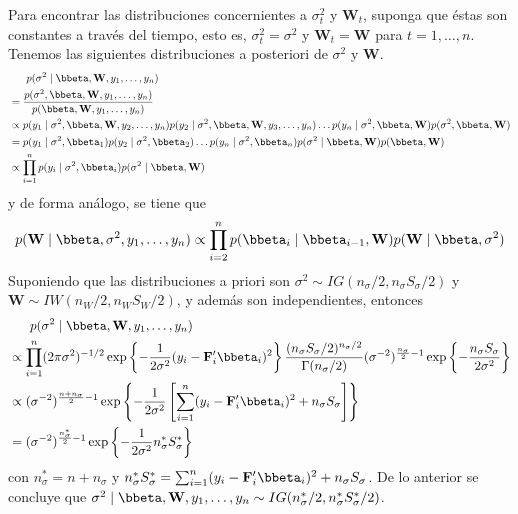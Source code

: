 Para encontrar las distribuciones concernientes a $\sigma^2_t$ y $\mathbf{W}_t$, suponga que éstas son constantes a través del tiempo, esto es, $\sigma^2_t=\sigma^2$ y $\mathbf{W}_t=\mathbf{W}$ para $t=1,\ldots,n$. Tenemos las siguientes distribuciones a posteriori de $\sigma^2$ y $\mathbf{W}$.
\begin{align*}
&\ \ \ \ \ p(\sigma^2 \mid \bbeta,\mathbf{W},y_1,\ldots,y_n)\\
&=\frac{p(\sigma^2,\bbeta,\mathbf{W},y_1,\ldots,y_n)}{p(\bbeta,\mathbf{W},y_1,\ldots,y_n)}\\
&\propto p(y_1 \mid \sigma^2,\bbeta,\mathbf{W},y_2,\ldots,y_n)p(y_2 \mid \sigma^2,\bbeta,\mathbf{W},y_3,\ldots,y_n)\ldots p(y_n \mid \sigma^2,\bbeta,\mathbf{W})p(\sigma^2,\bbeta,\mathbf{W})\\
&=p(y_1 \mid \sigma^2,\bbeta_1)p(y_2 \mid \sigma^2,\bbeta_2)\ldots p(y_n \mid \sigma^2,\bbeta_n)p(\sigma^2 \mid \bbeta,\mathbf{W})p(\bbeta,\mathbf{W})\\
&\propto \prod_{i=1}^np(y_i \mid \sigma^2,\bbeta_i)p(\sigma^2 \mid \bbeta,\mathbf{W})
\end{align*}
y de forma análogo, se tiene que
\begin{equation*}
p(\mathbf{W} \mid \bbeta,\sigma^2,y_1,\ldots,y_n)\propto\prod_{i=2}^np(\bbeta_i \mid \bbeta_{i-1},\mathbf{W})p(\mathbf{W} \mid \bbeta,\sigma^2)
\end{equation*}
Suponiendo que las distribuciones a priori son $\sigma^2\sim IG(n_\sigma/2,n_\sigma S_\sigma/2)$ y $\mathbf{W}\sim IW(n_W/2,n_WS_W/2)$, y además son independientes, entonces
\begin{align*}
&\ \ \ \ \ p(\sigma^2 \mid \bbeta,\mathbf{W},y_1,\ldots,y_n)\\
&\propto \prod_{i=1}^n(2\pi\sigma^2)^{-1/2}\exp\left\{-\frac{1}{2\sigma^2}(y_i-\mathbf{F}'_i\bbeta_i)^2\right\}\frac{(n_\sigma S_\sigma/2)^{n_\sigma/2}}{\Gamma(n_\sigma/2)}(\sigma^{-2})^{\frac{n_\sigma}{2}-1}\exp\left\{-\frac{n_\sigma S_\sigma}{2\sigma^2}\right\}\\
&\propto (\sigma^{-2})^{\frac{n+n_\sigma}{2}-1}\exp\left\{-\frac{1}{2\sigma^2}\left[\sum_{i=1}^n(y_i-\mathbf{F}'_i\bbeta_i)^2+n_\sigma S_\sigma\right]\right\}\\
&=(\sigma^{-2})^{\frac{n_\sigma^*}{2}-1}\exp\left\{-\frac{1}{2\sigma^2}n_\sigma^*S_\sigma^*\right\}
\end{align*}
con $n_\sigma^*=n+n_\sigma$ y $n_\sigma^* S_\sigma^*=\sum_{i=1}^n(y_i-\mathbf{F}'_i\bbeta_i)^2+n_\sigma S_\sigma$. De lo anterior se concluye que $\sigma^2 \mid \bbeta,\mathbf{W},y_1,\ldots,y_n\sim IG(n_\sigma^*/2,n_\sigma^* S_\sigma^*/2)$.

